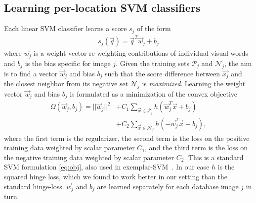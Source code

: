    \subsection{Learning per-location SVM classifiers }
      Each linear SVM classifier learns a score $s_j$ of the form 
      \begin{align}
        s_j(\vec{q})=\vec{q}^T \vec{w}_j+b_j
        \label{eq:linear}
      \end{align}
      \noindent
      where $\vec{w}_j$ is a weight vector re-weighting contributions of individual visual words and $b_j$ is the bias specific for image $j$. Given the training sets $\mathcal P_j$ and $\mathcal N_j$, the aim is to find a vector $\vec{w}_j$ and bias $b_j$ such that the score difference between $\vec{x_j}$ and the closest neighbor from its negative set $\mathcal N_j$ is {\em maximized}. %
      Learning the weight vector $\vec{w}_j$ and bias $b_j$ is formulated as a minimization of the convex objective 
      \begin{align}
        \nonumber
        \Omega(\vec{w}_j,b_j)=||\vec{w}_j||^{2}& +C_1\sum_{\vec{x}\in \mathcal P_j}h(\vec{w}_j^T\vec{x}+b_j)   \\
        \label{eq:obj}
                           & +C_2\sum_{\vec{x}\in \mathcal N_j}h(-\vec{w}_j^T\vec{x}-b_j), 
      \end{align}
      \noindent
      where the first term is the regularizer, the second term is the loss on the positive training data weighted by scalar parameter $C_1$, and the third term is the loss on the negative training data weighted by scalar parameter $C_2$.   
      This is a standard SVM formulation \eqref{eq:obj}, also used in exemplar-SVM~\cite{Malisiewicz11}.
      In our case $h$ is the squared hinge loss, which we found to work better in our setting than the standard hinge-loss. $\vec{w}_j$ and $b_j$ are learned separately for each database image $j$ in turn. 
     
